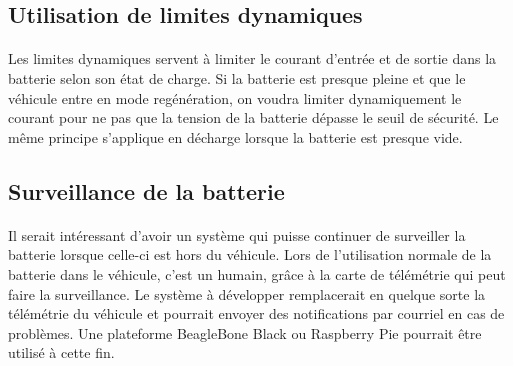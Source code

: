 	\subsection{Utilisation de limites dynamiques}

		\paragraph{}
		Les limites dynamiques servent à limiter le courant d'entrée et de sortie dans la batterie selon son état de charge. Si la batterie est presque pleine et que le véhicule entre en mode regénération, on voudra limiter dynamiquement le courant pour ne pas que la tension de la batterie dépasse le seuil de sécurité. Le même principe s'applique en décharge lorsque la batterie est presque vide. 

	\subsection{Surveillance de la batterie}

		\paragraph{}
		Il serait intéressant d'avoir un système qui puisse continuer de surveiller la batterie lorsque celle-ci est hors du véhicule. Lors de l'utilisation normale de la batterie dans le véhicule, c'est un humain, grâce à la carte de télémétrie qui peut faire la surveillance. Le système à développer remplacerait en quelque sorte la télémétrie du véhicule et pourrait envoyer des notifications par courriel en cas de problèmes. Une plateforme BeagleBone Black ou Raspberry Pie pourrait être utilisé à cette fin.



